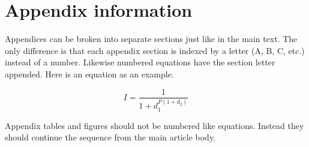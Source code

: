 \documentclass{aastex63}
\begin{document}


\appendix

\section{Appendix information}

Appendices can be broken into separate sections just like in the main text.
The only difference is that each appendix section is indexed by a letter
(A, B, C, etc.) instead of a number.  Likewise numbered equations have
the section letter appended.  Here is an equation as an example.

\begin{equation}
I = \frac{1}{1 + d_{1}^{P (1 + d_{2} )}}
\end{equation}

Appendix tables and figures should not be numbered like equations. Instead
they should continue the sequence from the main article body.



{}



\end{document}
